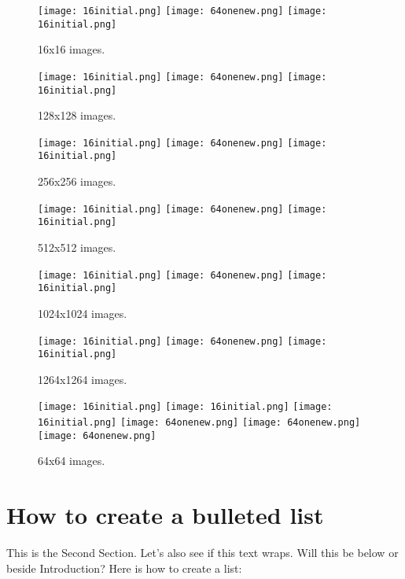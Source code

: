 \documentclass{article}
\begin{document}
\begin{multicols}{2}

\begin{figure}[H]
\centering
\texttt{[image: 16initial.png]}
\texttt{[image: 64onenew.png]}
\texttt{[image: 16initial.png]}
\caption{16x16 images.}
\end{figure}

\begin{figure}[H]
\centering
\texttt{[image: 16initial.png]}
\texttt{[image: 64onenew.png]}
\texttt{[image: 16initial.png]}
\caption{128x128 images.}
\end{figure}

\begin{figure}[H]
\centering
\texttt{[image: 16initial.png]}
\texttt{[image: 64onenew.png]}
\texttt{[image: 16initial.png]}
\caption{256x256 images.}
\end{figure}

\begin{figure}[H]
\centering
\texttt{[image: 16initial.png]}
\texttt{[image: 64onenew.png]}
\texttt{[image: 16initial.png]}
\caption{512x512 images.}
\end{figure}

\begin{figure}[H]
\centering
\texttt{[image: 16initial.png]}
\texttt{[image: 64onenew.png]}
\texttt{[image: 16initial.png]}
\caption{1024x1024 images.}
\end{figure}

\begin{figure}[H]
\centering
\texttt{[image: 16initial.png]}
\texttt{[image: 64onenew.png]}
\texttt{[image: 16initial.png]}
\caption{1264x1264 images.}
\end{figure}

\end{multicols}

\begin{figure}[H]
\centering
\texttt{[image: 16initial.png]}
\texttt{[image: 16initial.png]}
\texttt{[image: 16initial.png]}
\texttt{[image: 64onenew.png]}
\texttt{[image: 64onenew.png]}
\texttt{[image: 64onenew.png]}
\caption{64x64 images.}
\end{figure}

\section{How to create a bulleted list}
This is the Second Section. Let's also see if this text wraps. Will this be below or beside Introduction? Here is how to create a list:
\end{document}
